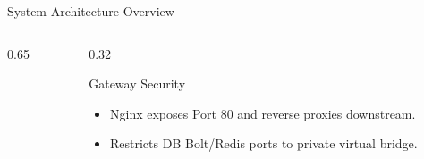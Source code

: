 \documentclass[aspectratio=169, 10pt]{beamer}
\begin{document}
\begin{frame}{System Architecture Overview}
\begin{columns}[T]
\begin{column}{0.65\textwidth}
{
      }
    \end{column}
    \begin{column}{0.32\textwidth}
      \begin{scard}{Gateway Security}
        \begin{itemize}\setlength{\itemsep}{0.5pt}
          \item Nginx exposes Port 80 and reverse proxies downstream.
          \item Restricts DB Bolt/Redis ports to private virtual bridge.
        \end{itemize}
      \end{scard}
    \end{column}
  \end{columns}
\end{frame}
\end{document}
